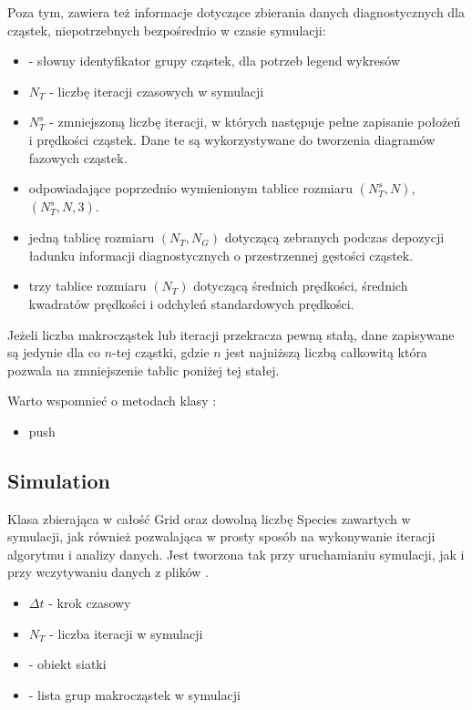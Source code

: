 Poza tym, zawiera też informacje dotyczące zbierania danych diagnostycznych
dla cząstek, niepotrzebnych bezpośrednio w czasie symulacji:
\begin{itemize}
    \item {} - słowny identyfikator grupy cząstek, dla potrzeb legend wykresów
    \item $N_T$ - liczbę iteracji czasowych w symulacji
    \item $N_T^s$ - zmniejszoną liczbę iteracji, w których następuje pełne
        zapisanie położeń i prędkości cząstek.  Dane te są wykorzystywane
        do tworzenia diagramów fazowych cząstek.
    \item odpowiadające poprzednio wymienionym tablice rozmiaru $(N_T^s,
        N)$, $(N_T^s, N, 3)$.  \item jedną tablicę rozmiaru $(N_T, N_G)$
        dotyczącą zebranych podczas
        depozycji ładunku informacji diagnostycznych o przestrzennej
        gęstości cząstek.
    \item trzy tablice rozmiaru $(N_T)$ dotyczącą średnich prędkości,
        średnich kwadratów prędkości i odchyleń standardowych prędkości.
\end{itemize}

Jeżeli liczba makrocząstek lub iteracji przekracza pewną stałą, dane zapisywane są jedynie dla co $n$-tej cząstki,
gdzie $n$ jest najniższą liczbą całkowitą która pozwala na zmniejszenie tablic poniżej tej stałej.

Warto wspomnieć o metodach klasy :
\begin{itemize}
    \item push 
\end{itemize}

\subsection{Simulation}
Klasa zbierająca w całość Grid oraz dowolną liczbę Species zawartych w
symulacji, jak również pozwalająca w prosty sposób na wykonywanie iteracji
algorytmu i analizy danych. Jest tworzona tak przy uruchamianiu symulacji,
jak i przy wczytywaniu danych z plików .

\begin{itemize}
    \item $\Delta t$ - krok czasowy
    \item $N_T$ - liczba iteracji w symulacji
    \item {} - obiekt siatki
    \item {} - lista grup makrocząstek w symulacji
\end{itemize}

